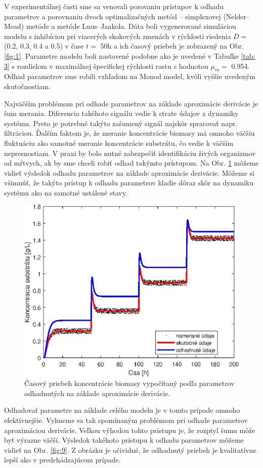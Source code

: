 V experimentálnej časti sme sa venovali porovaniu prístupov k odhadu parametrov a porovnaniu dvoch optimalizačných metód -- simplexovej (Nelder--Mead) metóde a metóde Luus--Jaakola. Dáta boli vygenerované simuláciou modelu s inhibíciou pri viacerých skokových zmenách v rýchlosti riedenia $D = $ (0.2, 0.3, 0.4 a 0.5) v čase $t = $ 50\unit{\hour} a ich časový priebeh je zobrazený na Obr. \ref{fig:1}. Parametre modelu boli nastavené podobne ako je uvedené v Tabuľke \ref{tab: 3} s rozdielom v maximálnej špecifickej rýchlosti rastu s hodnotou $\mu_{m} = $ 0.954. Odhad parametrov sme robili vzhľadom na Monod model, kvôli vyššie uvedeným skutočnostiam. 

Najväčším problémom pri odhade parametrov na základe aproximácie derivácie je šum merania. Diferencia takéhoto signálu vedie k strate údajov z dynamiky systému. Preto je potrebné takýto zašumený signál najskôr spracovať napr. filtráciou. Ďalším faktom je, že meranie koncentrácie biomasy má omnoho väčšiu fluktuáciu ako samotné meranie koncentrácie substrátu, čo vedie k väčším nepresnostiam. V praxi by bolo nutné zabezpečiť identifikáciu živých organizmov od mŕtvych, ak by sme chceli robiť odhad takýmto prístupom. Na Obr. \ref{fig:8} môžeme vidieť výsledok odhadu parametrov na základe aproximácie derivácie. Môžeme si všimnúť, že takýto prístup k odhadu parametrov kladie dôraz skôr na dynamiku systému ako na samotné ustálené stavy.

\begin{figure}
	\centering
	\includegraphics[width=.7\linewidth]{images/der_approximation}
	\caption[]{Časový priebeh koncentrácie biomasy vypočítaný podľa parametrov odhadnutých na základe aproximácie derivácie.}
	\label{fig:8}
\end{figure}

Odhadovať parametre na základe celého modelu je v tomto prípade omnoho efektívnejšie. Vyhneme sa tak spomínaným problémom pri odhade parametrov aproximáciou derivácie. Veľkou výhodou tohto prístupu je, že rozptyl šumu môže byť výrazne väčší. Výsledok takéhoto prístupu k odhadu parametrov môžeme vidieť na Obr. \ref{fig:9}. Z obrázku je očividné, že odhadnutý priebeh je kvalitatívne lepší ako v predchádzajúcom prípade.

